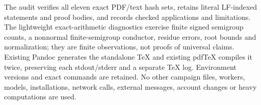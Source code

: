 \documentclass[
  10pt,
]{article}
\begin{document}
The audit verifies all eleven exact PDF/text hash sets, retains literal
LF-indexed statements and proof bodies, and records checked applications
and limitations. The lightweight exact-arithmetic diagnostics exercise
finite signed semigroup counts, a nonnormal finite-semigroup conductor,
residue errors, root bounds and normalization; they are finite
observations, not proofs of universal claims. Existing Pandoc generates
the standalone TeX and existing pdfTeX compiles it twice, preserving
each stdout/stderr and a separate TeX log. Environment versions and
exact commands are retained. No other campaign files, workers, models,
installations, network calls, external messages, account changes or
heavy computations are used.
\end{document}
